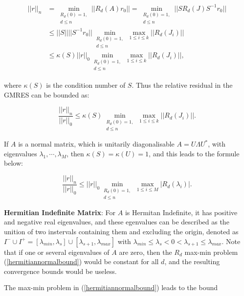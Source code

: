 {	\begin{subequations}
		\begin{align}
		||r||_n&=\min_{\substack{R_d(0)=1, \\ d \leq n}}||R_d(A)r_0||=\min_{\substack{R_d(0)=1, \\ d \leq n}}||SR_d(J)S^{-1}r_0||\\
		&\leq ||S||||S^{-1}r_0||\min_{\substack{R_d(0)=1, \\ d \leq n}} \max_{1 \leq i \leq k}||R_d(J_i)|| \label{lowboundd}\\
		&\leq \kappa(S)||r||_0\min_{\substack{R_d(0)=1, \\ d \leq n}} \max_{1 \leq i \leq k}||R_d(J_i)||, \label{lowlowboundd}
		\end{align}
	\end{subequations}
	
	where $\kappa(S)$ is the condition number of $S$. Thus the relative residual in the GMRES can be bounded as:
	
	\begin{equation}
	\label{allbound}
	\frac{||r||_n}{||r||_0} \leq \kappa(S)\min_{\substack{R_d(0)=1, \\ d \leq n}} \max_{1 \leq i \leq k}||R_d(J_i)||.
	\end{equation}
	
	If $A$ is a normal matrix, which is unitarily diagonalisable $A=U\Lambda U^*$, with eigenvalues $\lambda_1, \cdots, \lambda_M$, then $\kappa(S)=\kappa(U)=1$, and this leads to the formule below:
	
	\begin{equation}
	\label{hermitiannormalbound}
	\frac{||r||_n}{||r||_0} \leq ||r||_0\min_{\substack{R_d(0)=1, \\ d \leq n}} \max_{1 \leq i \leq M}|R_d(\lambda_i)|.
	\end{equation}
	
	\textbf{Hermitian Indefinite Matrix}: For $A$ is Hermitan Indefinite, it has positive and negative real eigenvalues, and these egenvalues can be described as the unition of two instervals containing them and excluding the origin, denoted as $I^{-} \cup I^{+}=[\lambda_{min}, \lambda_s] \cup [\lambda_{s+1}, \lambda_{max}]$ with $\lambda_{min} \leq \lambda_s < 0 < \lambda_{s+1} \leq \lambda_{max}$. Note that if one or several eigenvalues of $A$ are zero, then the $R_d$ max-min problem (\ref{hermitiannormalbound}) would be constant for all $d$, and the resulting convergence bounds would be useless. 
	
	The max-min problem in (\ref{hermitiannormalbound}) leads to the bound
	
}
